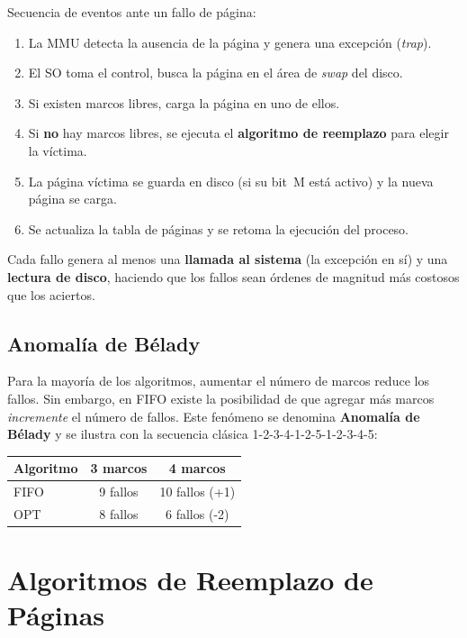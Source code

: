 \documentclass[12pt, a4paper]{article}
\begin{document}
Secuencia de eventos ante un fallo de página:
\begin{enumerate}
  \item La MMU detecta la ausencia de la página y genera una excepción (\textit{trap}).
  \item El SO toma el control, busca la página en el área de \textit{swap} del disco.
  \item Si existen marcos libres, carga la página en uno de ellos.
  \item Si \textbf{no} hay marcos libres, se ejecuta el \textbf{algoritmo de reemplazo} para elegir la víctima.
  \item La página víctima se guarda en disco (si su bit~M está activo) y la nueva página se carga.
  \item Se actualiza la tabla de páginas y se retoma la ejecución del proceso.
\end{enumerate}

Cada fallo genera al menos una \textbf{llamada al sistema} (la excepción en sí) y una \textbf{lectura de disco}, haciendo que los fallos sean órdenes de magnitud más costosos que los aciertos.

\subsection{Anomalía de Bélady}

Para la mayoría de los algoritmos, aumentar el número de marcos reduce los fallos. Sin embargo, en FIFO existe la posibilidad de que agregar más marcos \emph{incremente} el número de fallos. Este fenómeno se denomina \textbf{Anomalía de Bélady} y se ilustra con la secuencia clásica 1-2-3-4-1-2-5-1-2-3-4-5:

\begin{center}
\begin{tabular}{lcc}
  \toprule
  Algoritmo & 3 marcos & 4 marcos \\
  \midrule
  FIFO & 9 fallos & 10 fallos \textcolor{rojoFallo}{(+1)} \\
  OPT  & 8 fallos &  6 fallos \textcolor{verdeHit}{(-2)} \\
  \bottomrule
\end{tabular}
\end{center}

\section{Algoritmos de Reemplazo de Páginas}
\end{document}
